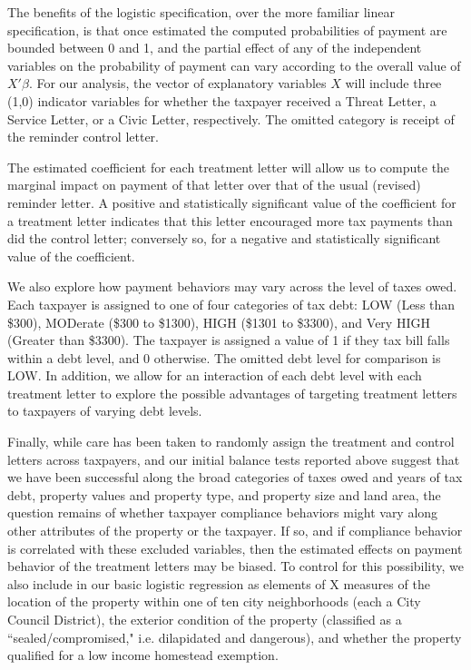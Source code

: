\documentclass[12pt,titlepage]{article}
\begin{document}
The benefits of the logistic specification, over the more familiar
linear specification, is that once estimated the computed
probabilities of payment are bounded between 0 and 1, and the partial
effect of any of the independent variables on the probability of
payment can vary according to the overall value of $X'\beta$.  For our
analysis, the vector of explanatory variables $X$ will include three
(1,0) indicator variables for whether the taxpayer received a Threat
Letter, a Service Letter, or a Civic Letter, respectively.  The
omitted category is receipt of the reminder control letter.

The estimated coefficient for each treatment letter will allow us to
compute the marginal impact on payment of that letter over that of the
usual (revised) reminder letter.  A positive and statistically
significant value of the coefficient for a treatment letter indicates
that this letter encouraged more tax payments than did the control
letter; conversely so, for a negative and statistically significant
value of the coefficient.  

We also explore how payment behaviors may vary across the level of
taxes owed.  Each taxpayer is assigned to one of four categories of
tax debt: LOW (Less than \$300), MODerate (\$300 to \$1300), HIGH
(\$1301 to \$3300), and Very HIGH (Greater than \$3300).  The taxpayer
is assigned a value of 1 if they tax bill falls within a debt level,
and 0 otherwise.  The omitted debt level for comparison is LOW.  In
addition, we allow for an interaction of each debt level with each
treatment letter to explore the possible advantages of targeting
treatment letters to taxpayers of varying debt levels. 

Finally, while care has been taken to randomly assign the treatment
and control letters across taxpayers, and our initial balance tests
reported above suggest that we have been successful along the broad
categories of taxes owed and years of tax debt, property values and
property type, and property size and land area, the question remains
of whether taxpayer compliance behaviors might vary along other
attributes of the property or the taxpayer.  If so, and if compliance
behavior is correlated with these excluded variables, then the
estimated effects on payment behavior of the treatment letters may be
biased.  To control for this possibility, we also include in our basic
logistic regression as elements of X measures of the location of the
property within one of ten city neighborhoods (each a City Council
District), the exterior condition of the property (classified as a
``sealed/compromised," i.e. dilapidated and dangerous), and whether
the property qualified for a low income homestead exemption.  
\end{document}
